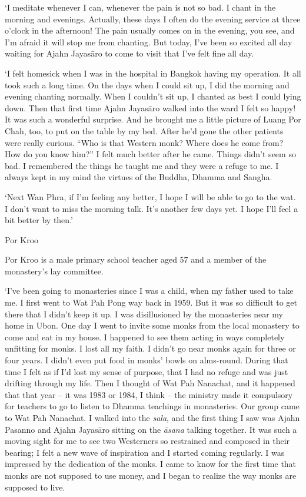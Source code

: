 `I meditate whenever I can, whenever the pain is not so bad. I chant in
the morning and evenings. Actually, these days I often do the evening
service at three o'clock in the afternoon! The pain usually comes on in
the evening, you see, and I'm afraid it will stop me from chanting. But
today, I've been so excited all day waiting for Ajahn Jayasāro to come
to visit that I've felt fine all day.

`I felt homesick when I was in the hospital in Bangkok having my
operation. It all took such a long time. On the days when I could sit
up, I did the morning and evening chanting normally. When I couldn't sit
up, I chanted as best I could lying down. Then that first time Ajahn
Jayasāro walked into the ward I felt so happy! It was such a wonderful
surprise. And he brought me a little picture of Luang Por Chah, too, to
put on the table by my bed. After he'd gone the other patients were
really curious. ``Who is that Western monk? Where does he come from? How
do you know him?'' I felt much better after he came. Things didn't seem
so bad. I remembered the things he taught me and they were a refuge to
me. I always kept in my mind the virtues of the Buddha, Dhamma and
Sangha.

`Next Wan Phra, if I'm feeling any better, I hope I will be able to go
to the wat. I don't want to miss the morning talk. It's another few days
yet. I hope I'll feel a bit better by then.'

Por Kroo

Por Kroo is a male primary school teacher aged 57 and a member of the
monastery's lay committee.

`I've been going to monasteries since I was a child, when my father used
to take me. I first went to Wat Pah Pong way back in 1959. But it was so
difficult to get there that I didn't keep it up. I was disillusioned by
the monasteries near my home in Ubon. One day I went to invite some
monks from the local monastery to come and eat in my house. I happened
to see them acting in ways completely unfitting for monks. I lost all my
faith. I didn't go near monks again for three or four years. I didn't
even put food in monks' bowls on alms-round. During that time I felt as
if I'd lost my sense of purpose, that I had no refuge and was just
drifting through my life. Then I thought of Wat Pah Nanachat, and it
happened that that year -- it was 1983 or 1984, I think -- the
ministry made it compulsory for teachers to go to listen to Dhamma
teachings in monasteries. Our group came to Wat Pah Nanachat. I walked
into the \emph{sala}, and the first thing I saw was Ajahn Pasanno and
Ajahn Jayasāro sitting on the \emph{āsana} talking together. It was such
a moving sight for me to see two Westerners so restrained and composed
in their bearing; I felt a new wave of inspiration and I started coming
regularly. I was impressed by the dedication of the monks. I came to
know for the first time that monks are not supposed to use money, and I
began to realize the way monks are supposed to live.

